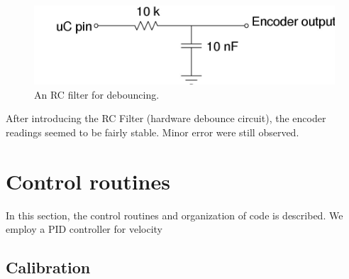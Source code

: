 \documentclass[10pt,a4paper]{article}
\begin{document}
\begin{figure}[h]
    \centering
    \includegraphics[scale=0.5]{debouncer.jpg}
    \caption{An RC filter for debouncing.}
    \label{fig:rcfilter}
\end{figure}

After introducing the RC Filter (hardware debounce circuit), the
encoder readings seemed to be fairly stable. Minor error were still
observed. 

\section{Control routines}

In this section, the control routines and organization of code is
described. We employ a PID controller for velocity 

\subsection{Calibration}
\end{document}
